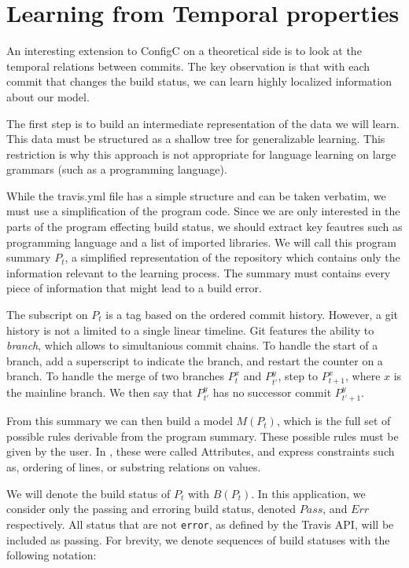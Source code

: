 \section{Learning from Temporal properties}

An interesting extension to ConfigC on a theoretical side is to look at the temporal relations between commits.
The key observation is that with each commit that changes the build status, we can learn highly localized information about our model.

The first step is to build an intermediate representation of the data we will learn.
This data must be structured as a shallow tree for generalizable learning.
This restriction is why this approach is not appropriate for language learning on large grammars (such as a programming language).


While the travis.yml file has a simple structure and can be taken verbatim, we must use a simplification of the program code.
Since we are only interested in the parts of the program effecting build status, we should extract key feautres such as programming language and a list of imported libraries.
We will call this program summary $P_t$, a simplified representation of the repository which contains only the information relevant to the learning process.
The summary must contains every piece of information that might lead to a build error.

The subscript on $P_t$ is a tag based on the ordered commit history.
However, a git history is not a limited to a single linear timeline.
Git features the ability to \textit{branch}, which allows to simultanious commit chains.
To handle the start of a branch, add a superscript to indicate the branch, and restart the counter on a branch.
To handle the merge of two branches $P_{t}^{x}$ and $P_{t'}^{y}$, step to $P_{t+1}^{x}$, where $x$ is the mainline branch.
We then say that $P_{t'}^{y}$ has no successor commit $P_{t'+1}^{y}$.

From this summary we can then build a model $M(P_t)$, which is the full set of possible rules derivable from the program summary.
These possible rules must be given by the user.
In \cite{Santolucito2016}, these were called Attributes, and express constraints such as, ordering of lines, or substring relations on values.

We will denote the build status of $P_t$ with $B(P_t)$.
In this application, we consider only the passing and erroring build status, denoted $Pass$, and $Err$ respectively.
All status that are not \verb|error|, as defined by the Travis API, will be included as passing.
For brevity, we denote sequences of build statuses with the following notation:

